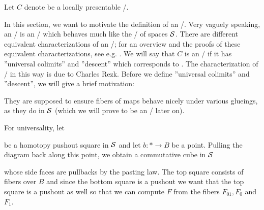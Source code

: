 Let $C$ denote be a locally presentable \inftycat/.

In this section, we want to motivate the definition of an \inftytop/.
Very vaguely speaking, an \inftytop/ is an \inftycat/ which behaves much like the \inftycat/ of spaces $\mathcal{S}$.
There are different equivalent characterizations of an \inftytop/; for an overview and the proofs of these equivalent characterizations, see e.g. %
.
We will say that $C$ is an \inftytop/ if it has ''universal colimits'' and ''descent'' which corresponds to %
.
The characterization of \inftytop/ in this way is due to Charles Rezk.
Before we define ''universal colimits'' and ''descent'', we will give a brief motivation:

They are supposed to ensure fibers of maps behave nicely under various glueings, as they do in $\mathcal{S}$ (which we will prove to be an \inftytop/ later on).

For universality, let 
\begin{center}
\end{center}
be a homotopy pushout square in $\mathcal{S}$ and let $b\colon*\to B$ be a point.
Pulling the diagram back along this point, we obtain a commutative cube in $\mathcal{S}$
\begin{center}
\end{center}
whose side faces are pullbacks by the pasting law.
The top square consists of fibers over $B$ and since the bottom square is a pushout we want that the top square is a pushout as well so that we can compute $F$ from the fibers $F_{01},F_0$ and $F_1$. 

